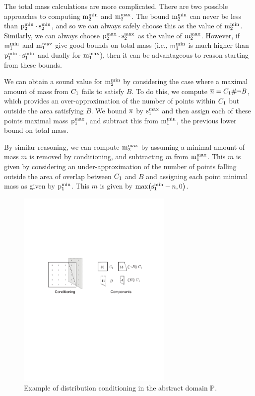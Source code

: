 The total mass calculations are more complicated.  
There are two
possible approaches to computing $\mathrm{m}^\mathrm{min}_{2}$ and $\mathrm{m}^\mathrm{max}_{2}$.  The bound
$\mathrm{m}^\mathrm{min}_{2}$ can never be less than $\mathrm{p}^\mathrm{min}_{2} \cdot \mathrm{s}^\mathrm{min}_{2}$, and so we
can always safely choose this as the value of $\mathrm{m}^\mathrm{min}_{2}$.  Similarly,
we can always choose $\mathrm{p}^\mathrm{max}_{2} \cdot \mathrm{s}^\mathrm{max}_{2}$ as the value of
$\mathrm{m}^\mathrm{max}_{2}$.  However, if $\mathrm{m}^\mathrm{min}_{1}$ and $\mathrm{m}^\mathrm{max}_{1}$ give good bounds on
total mass (i.e., $\mathrm{m}^\mathrm{min}_{1}$ is much higher than $\mathrm{p}^\mathrm{min}_{1} \cdot
\mathrm{s}^\mathrm{min}_{1}$ and dually for $\mathrm{m}^\mathrm{max}_{1}$), then it can be advantageous
to reason starting from these bounds.

We can obtain a sound value for $\mathrm{m}^\mathrm{min}_{2}$ by considering
the case where a maximal amount of mass from $C_{1}$
fails to satisfy $B$.  To do this, we compute
$\overline{n} = C_{1} \# \neg\mathit{B}$, which provides an
over-approximation of the number of points within $C_{1}$ but
outside the area satisfying $B$.  We bound $\overline{n}$ by $\mathrm{s}^\mathrm{max}_{1}$ and then assign each of
these points maximal mass $\mathrm{p}^\mathrm{max}_{1}$, and subtract this
from $\mathrm{m}^\mathrm{min}_{1}$, the previous lower bound on total mass.

By similar reasoning, we can compute $\mathrm{m}^\mathrm{max}_{2}$ by assuming a minimal amount
of mass $m$ is removed by conditioning, and subtracting $m$
from $\mathrm{m}^\mathrm{max}_{1}$.  This $m$ is given by
considering an under-approximation of the number of points falling
outside the area of overlap between $C_{1}$ and $B$ and assigning
each point minimal mass as
given by $\mathrm{p}^\mathrm{min}_{1}$.  This $m$ is given by $\max\bigl( \mathrm{s}^\mathrm{min}_{1}-n, 0 \bigr)$.

\begin{figure}
\begin{center}
\includegraphics[width=7.5cm]{figures/conditioning-smaller.pdf}
\end{center}
\caption{\label{fig:conditioning} Example of distribution conditioning in the abstract domain $\mathbb{P}$.}
\end{figure}

